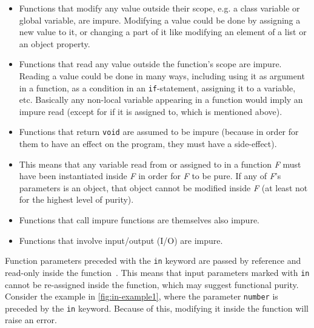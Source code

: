 \documentclass[a4paper,12pt]{article}
\begin{document}
\begin{itemize}
  \item Functions that modify any value outside their scope, e.g. a class variable or global variable, are impure. Modifying a value could be done by assigning a new value to it, or changing a part of it like modifying an element of a list or an object property.
  \item Functions that read any value outside the function's scope are impure. Reading a value could be done in many ways, including using it as argument in a function, as a condition in an \texttt{if}-statement, assigning it to a variable, etc. Basically any non-local variable appearing in a function would imply an impure read (except for if it is assigned to, which is mentioned above).
  \item Functions that return \texttt{void} are assumed to be impure (because in order for them to have an effect on the program, they must have a side-effect).
  \item
  This means that any variable read from or assigned to in a function \textit{F} must have been instantiated inside \textit{F} in order for \textit{F} to be pure.
  If any of \textit{F}'s parameters is an object, that object cannot be modified inside \textit{F} (at least not for the highest level of purity).
  \item Functions that call impure functions are themselves also impure.
  \item Functions that involve input/output (I/O) are impure.
\end{itemize}

Function parameters preceded with the \texttt{in} keyword are passed by reference and read-only inside the function~\cite{microsoft-in-modifier}. %
This means that input parameters marked with \texttt{in} cannot be re-assigned inside the function, which may suggest functional purity. Consider the example in \autoref{fig:in-example1}, where the parameter \texttt{number} is preceded by the \texttt{in} keyword. Because of this, modifying it inside the function will raise an error.
\end{document}
